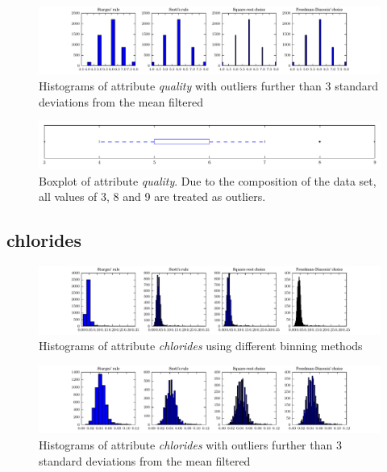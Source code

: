 \documentclass{report}
\begin{document}
\begin{figure}[H]
\includegraphics[width=\textwidth]{histograms/quality_filtered.pdf}
\caption{Histograms of attribute \emph{quality} with outliers further than 3 standard deviations from the mean filtered}
\end{figure}

\begin{figure}[H]
\includegraphics[width=\textwidth]{boxplots/quality.pdf}
\caption{Boxplot of attribute \emph{quality}. Due to the composition of the data set, all values of 3, 8 and 9 are treated as outliers.}\end{figure}

\newpage
\subsection{chlorides}
\begin{figure}[H]
\includegraphics[width=\textwidth]{histograms/chlorides.pdf}
\caption{Histograms of attribute \emph{chlorides} using different binning methods}\end{figure}

\begin{figure}[H]
\includegraphics[width=\textwidth]{histograms/chlorides_filtered.pdf}
\caption{Histograms of attribute \emph{chlorides} with outliers further than 3 standard deviations from the mean filtered}
\end{figure}
\end{document}
